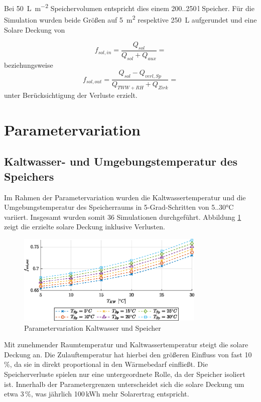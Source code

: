 Bei \SI{50}{\liter\per\square\meter} Speichervolumen entspricht dies einem 200..250\,l Speicher. Für die Simulation wurden beide Größen auf \SI{5}{\square\meter} respektive \SI{250}{\liter} aufgerundet und eine Solare Deckung von

\begin{equation}
	\label{eq:fsolin}
	f_{sol,in} = \frac{Q_{sol}}{Q_{sol}+Q_{aux}} =
\end{equation}
beziehungsweise
\begin{equation}
	\label{eqfsolout:}
	f_{sol,out} = \frac{Q_{sol}-Q_{verl,Sp}}{Q_{TWW+RH}+Q_{Zirk}}=
\end{equation}
unter Berücksichtigung der Verluste erzielt.

\section{Parametervariation}
\subsection{Kaltwasser- und Umgebungstemperatur des Speichers}
Im Rahmen der Parametervariation wurden die Kaltwassertemperatur und die Umgebungstemperatur des Speicherraums in 5-Grad-Schritten von 5..30\si{\celsius} variiert. Insgesamt wurden somit 36 Simulationen durchgeführt. Abbildung \ref{fig:par1} zeigt die erzielte solare Deckung inklusive Verlusten.
\begin{figure}[H]
	\centering
	\includegraphics[width=0.8\textwidth]{../DATA/Aufgabe2.2.eps}
	\caption[Parametervariation Kaltwasser und Speicher]{Parametervariation Kaltwasser und Speicher}
	\label{fig:par1}
\end{figure}

Mit zunehmender Raumtemperatur und Kaltwassertemperatur steigt die solare Deckung an. Die Zulauftemperatur hat hierbei den größeren Einfluss von fast 10\,\%, da sie in direkt proportional in den Wärmebedarf einfließt. Die Speicherverluste spielen nur eine untergeordnete Rolle, da der Speicher isoliert ist. Innerhalb der Parametergrenzen unterscheidet sich die solare Deckung um etwa 3\,\%, was jährlich 100\,kWh mehr Solarertrag entspricht.

